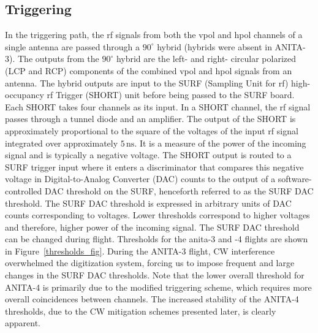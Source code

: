 \subsection{Triggering}
\label{trigger}

In the triggering path, the \gls{rf} signals from both the \gls{vpol} and \gls{hpol} channels of a single antenna 
are passed through a $90^{\circ}$ hybrid (hybrids were absent in ANITA-3). 
The outputs from the $90^{\circ}$ hybrid are the left- and right- circular polarized
(LCP and RCP) components of the combined \gls{vpol} and \gls{hpol} signals from an antenna. 
The hybrid outputs are input to the SURF (Sampling Unit for \gls{rf}) high-occupancy \gls{rf} Trigger (SHORT) unit before being passed to the SURF board. 
Each SHORT takes four channels as its input. 
In a SHORT
channel, the \gls{rf} signal passes through a tunnel diode and an amplifier. 
The output of the SHORT is
approximately proportional to the square of the voltages
of the input \gls{rf} signal integrated over approximately $5\,\mbox{ns}$.
It is a measure of the power of the incoming signal and is typically a negative voltage.
The SHORT output is routed to a SURF trigger input where 
it enters a discriminator that compares this negative voltage in Digital-to-Analog Converter (DAC) counts to the output
of a software-controlled DAC threshold on the SURF, henceforth referred to as the SURF DAC threshold. 
The SURF DAC threshold is expressed in arbitrary units of DAC counts corresponding to voltages. Lower thresholds 
correspond to higher voltages and therefore, higher power of the incoming signal. 
The SURF DAC threshold can be changed during flight. Thresholds for the \gls{anita}-3 and -4 flights are shown in Figure~\ref{thresholds_fig}. 
During the ANITA-3 flight, CW interference overwhelmed the digitization system, forcing us to impose
frequent and large changes in the SURF DAC thresholds. 
Note that the lower overall threshold for ANITA-4 is primarily due to the modified triggering scheme, 
which requires more overall coincidences between channels. 
The increased stability of the ANITA-4 thresholds, due to the CW mitigation schemes presented later, is clearly apparent.

